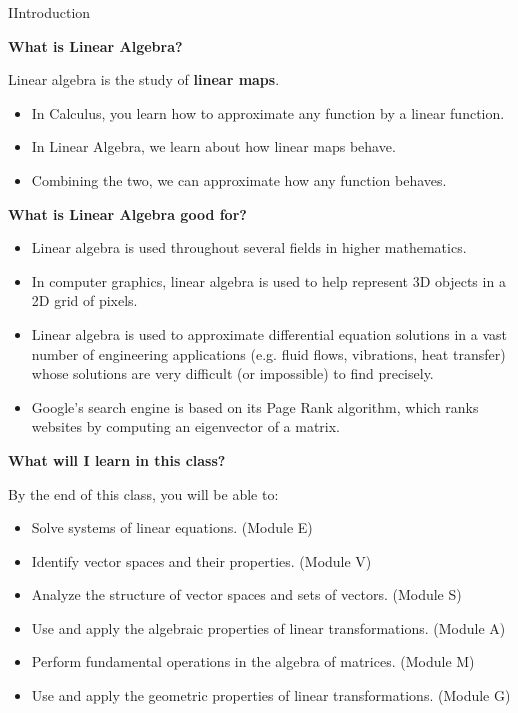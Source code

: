 
\begin{module}{I}{Introduction}
\begin{applicationActivities}{1}{1}

\begin{remark} \textbf{What is Linear Algebra?}

  Linear algebra is the study of \textbf{linear maps}.

  \begin{itemize}
  \item In Calculus, you learn how to approximate any function by a
        linear function.
  \item In Linear Algebra, we learn about how linear maps behave.
  \item Combining the two, we can approximate how any function behaves.
  \end{itemize}
\end{remark}

\begin{remark} \textbf{What is Linear Algebra good for?}
  \begin{itemize}
  \item Linear algebra is used throughout several fields
        in higher mathematics.
  \item In computer graphics, linear algebra is used to help represent
        3D objects in a 2D grid of pixels.
  \item Linear algebra is used to approximate
        differential equation solutions in a vast number of engineering
        applications (e.g. fluid flows, vibrations, heat transfer) whose
        solutions are very difficult (or impossible) to find precisely.
  \item Google's search engine is based on its Page Rank algorithm, which
        ranks websites by computing an eigenvector of a matrix.
  \end{itemize}
\end{remark}

\begin{remark} \textbf{What will I learn in this class?}

  By the end of this class, you will be able to:
  \begin{itemize}
  \item Solve systems of linear equations.
        (Module E)
  \item Identify vector spaces and their properties.
        (Module V)
  \item Analyze the structure of vector spaces and sets of vectors.
        (Module S)
  \item Use and apply the algebraic properties of linear transformations.
        (Module A)
  \item Perform fundamental operations in the algebra of matrices.
        (Module M)
  \item Use and apply the geometric properties of linear transformations.
        (Module G)
  \end{itemize}
\end{remark}

\end{applicationActivities}
\end{module}
